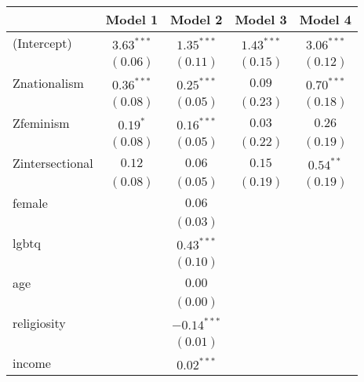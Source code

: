 \documentclass[
]{article}
\begin{document}
\begin{table}
\begin{center}
\begin{tabular}{l c c c c}
\hline
 & Model 1 & Model 2 & Model 3 & Model 4 \\
\hline
(Intercept)                      & $3.63^{***}$ & $1.35^{***}$  & $1.43^{***}$ & $3.06^{***}$ \\
                                 & $(0.06)$     & $(0.11)$      & $(0.15)$     & $(0.12)$     \\
Znationalism                     & $0.36^{***}$ & $0.25^{***}$  & $0.09$       & $0.70^{***}$ \\
                                 & $(0.08)$     & $(0.05)$      & $(0.23)$     & $(0.18)$     \\
Zfeminism                        & $0.19^{*}$   & $0.16^{***}$  & $0.03$       & $0.26$       \\
                                 & $(0.08)$     & $(0.05)$      & $(0.22)$     & $(0.19)$     \\
Zintersectional                  & $0.12$       & $0.06$        & $0.15$       & $0.54^{**}$  \\
                                 & $(0.08)$     & $(0.05)$      & $(0.19)$     & $(0.19)$     \\
female                           &              & $0.06$        &              &              \\
                                 &              & $(0.03)$      &              &              \\
lgbtq                            &              & $0.43^{***}$  &              &              \\
                                 &              & $(0.10)$      &              &              \\
age                              &              & $0.00$        &              &              \\
                                 &              & $(0.00)$      &              &              \\
religiosity                      &              & $-0.14^{***}$ &              &              \\
                                 &              & $(0.01)$      &              &              \\
income                           &              & $0.02^{***}$  &              &              \\

\end{tabular}
\end{center}
\end{table}
\end{document}
